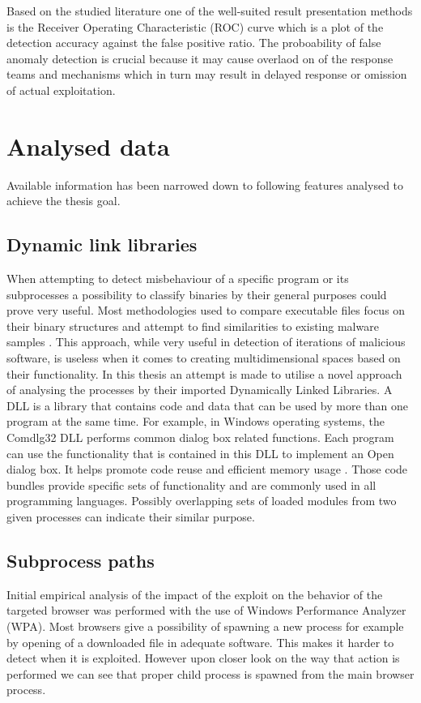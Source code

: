\documentclass[a4paper,twoside,12pt]{book}
\begin{document}
Based on the studied literature one of the well-suited result presentation methods is the Receiver 
Operating Characteristic (ROC) curve which is a plot of the detection accuracy against the false 
positive ratio. The proboability of false anomaly detection is crucial because it may cause overlaod
on of the response teams and mechanisms which in turn may result in delayed response or omission
of actual exploitation. 

\section{Analysed data}
Available information has been narrowed down to following features analysed to achieve the thesis
goal.

\subsection{Dynamic link libraries}

When attempting to detect misbehaviour of a specific program or its subprocesses a possibility to 
classify binaries by their general purposes could prove very useful. Most methodologies used to 
compare executable files focus on their binary structures and attempt to find similarities to 
existing malware samples \cite{bib:malwclass}. This approach, while very useful in detection of 
iterations of malicious software, is useless when it comes to creating multidimensional spaces 
based on their functionality. In this thesis an attempt is made to utilise a novel approach of 
analysing the processes by their imported Dynamically Linked Libraries. A DLL is a library that 
contains code and data that can be used by more than one program at the same time. For example, 
in Windows operating systems, the Comdlg32 DLL performs common dialog box related functions. Each 
program can use the functionality that is contained in this DLL to implement an Open dialog box. 
It helps promote code reuse and efficient memory usage \cite{bib:dll}. Those code bundles provide 
specific sets of functionality and are commonly used in all programming languages. Possibly 
overlapping sets of loaded modules from two given processes can indicate their similar purpose. 

\subsection{Subprocess paths}

Initial empirical analysis of the impact of the exploit on the behavior of the targeted browser was 
performed with the use of Windows Performance Analyzer (WPA).  Most browsers give a 
possibility of spawning a new process for example by opening of a downloaded file in 
adequate software. This makes it harder to detect when it is exploited. However upon 
closer look on the way that action is performed we can see that proper child process is 
spawned from the main browser process.
\end{document}
